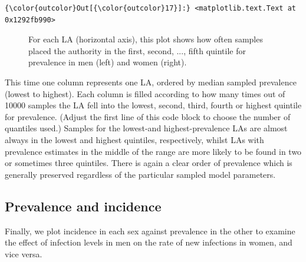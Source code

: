 \documentclass{article}
\begin{document}
    \begin{footnotesize}
            \begin{Verbatim}[commandchars=\\\{\}]
{\color{outcolor}Out[{\color{outcolor}17}]:} <matplotlib.text.Text at 0x1292fb990>
\end{Verbatim}
    \end{footnotesize}
        
    \begin{figure}
        \begin{center}\end{center}
        \caption{For each LA (horizontal axis), this plot shows how often samples placed the authority in the first, second, ..., fifth quintile for prevalence in men (left) and women (right).}
        \label{}
    \end{figure}
    
    This time one column represents one LA, ordered by median sampled
prevalence (lowest to highest). Each column is filled according to how
many times out of 10000 samples the LA fell into the lowest, second,
third, fourth or highest quintile for prevalence. (Adjust the first line
of this code block to choose the number of quantiles used.) Samples for
the lowest-and highest-prevalence LAs are almost always in the lowest
and highest quintiles, respectively, whilst LAs with prevalence
estimates in the middle of the range are more likely to be found in two
or sometimes three quintiles. There is again a clear order of prevalence
which is generally preserved regardless of the particular sampled model
parameters.

    \subsection{Prevalence and incidence}\label{prevalence-and-incidence}

Finally, we plot incidence in each sex against prevalence in the other
to examine the effect of infection levels in men on the rate of new
infections in women, and vice versa.
\end{document}
